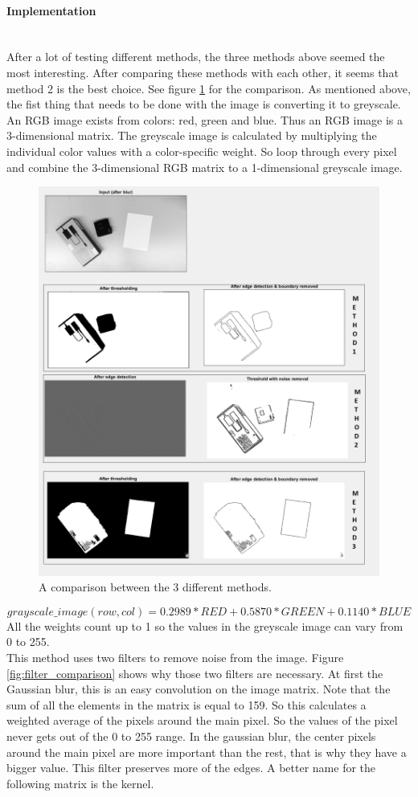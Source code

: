 \documentclass[11pt]{article}
\begin{document}
\paragraph{Implementation}\mbox{}\\
After a lot of testing different methods, the three methods above seemed the most interesting. After comparing these methods with each other, it seems that method 2 is the best choice. See figure \ref{fig:comparison_methods} for the comparison. As mentioned above, the fist thing that needs to be done with the image is converting it to greyscale. An RGB image exists from colors: red, green and blue. Thus an RGB image is a 3-dimensional matrix. The greyscale image is calculated by multiplying the individual color values with a color-specific weight. So loop through every pixel and combine the 3-dimensional RGB matrix to a 1-dimensional greyscale image.
\begin{figure}[h]
	\center
  \includegraphics[width=0.7\linewidth]{comparison_methods.png}
  \caption{A comparison between the 3 different methods.}
  \label{fig:comparison_methods}
\end{figure}
\begin{equation}
grayscale\_image(row, col) = 0.2989 * RED + 0.5870 * GREEN + 0.1140 * BLUE
\end{equation}
All the weights count up to 1 so the values in the greyscale image can vary from 0 to 255.
\\This method uses two filters to remove noise from the image. Figure \ref{fig:filter_comparison} shows why those two filters are necessary.
At first the Gaussian blur, this is an easy convolution on the image matrix. Note that the sum of all the elements in the matrix is equal to 159. So this calculates a weighted average of the pixels around the main pixel. So the values of the pixel never gets out of the 0 to 255 range. In the gaussian blur, the center pixels around the main pixel are more important than the rest, that is why they have a bigger value. This filter preserves more of the edges. A better name for the following matrix is the kernel.
\end{document}
